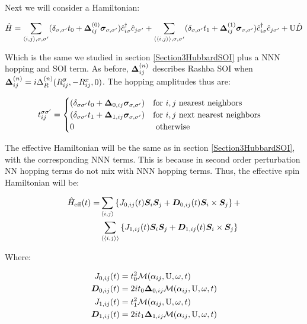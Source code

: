 Next we will consider a Hamiltonian:

\begin{equation}
\hat{H} = \sum_{\langle i,j \rangle, \sigma, \sigma'}(\delta_{\sigma, \sigma'} t_0 + \boldsymbol{\Delta}_{ij}^{(0)} \boldsymbol{\sigma}_{\sigma, \sigma'})\hat{c}_{i \sigma}^\dagger \hat{c}_{j \sigma'} + 
	\sum_{\langle \langle i,j \rangle \rangle, \sigma, \sigma'}(\delta_{\sigma, \sigma'} t_1 + \boldsymbol{\Delta}_{ij}^{(1)} \boldsymbol{\sigma}_{\sigma, \sigma'})\hat{c}_{i \sigma}^\dagger \hat{c}_{j \sigma'} + 
	\text{U}\hat{D}
\end{equation}

Which is the same we studied in section \ref{Section3HubbardSOI} plus a NNN hopping and SOI term. As before, $\boldsymbol{\Delta}_{ij}^{(n)}$ describes Rashba SOI when $\boldsymbol{\Delta}_{ij}^{(n)} = i\Delta_R^{(n)}(R_{ij}^y, -R_{ij}^x, 0)$.
The hopping amplitudes thus are:

\begin{equation}
\label{HoppHubbSOI}
t_{ij}^{\sigma \sigma'} = \begin{cases}
	(\delta_{\sigma \sigma'}t_0+\boldsymbol{\Delta}_{0,ij} \boldsymbol{\sigma}_{\sigma, \sigma'}) & \text{for } i, j \text{ nearest neighbors} \\
	(\delta_{\sigma \sigma'}t_1+\boldsymbol{\Delta}_{1,ij} \boldsymbol{\sigma}_{\sigma, \sigma'}) & \text{for } i, j \text{ next nearest neighbors} \\
	0 & \text{ otherwise}
\end{cases} \quad
\end{equation}

The effective Hamiltonian will be the same as in section \ref{Section3HubbardSOI}, with the corresponding NNN terms. This is because in second order perturbation NN hopping terms do not mix with NNN hopping terms. Thus, the effective spin Hamiltonian will be:

\begin{align}
\hat{H}_{\text{eff}}(t) = &\sum_{\langle i,j \rangle} \left\{ J_{0,ij}(t)\boldsymbol{S}_i\boldsymbol{S}_j + \boldsymbol{D}_{0,ij}(t) \boldsymbol{S}_i \times \boldsymbol{S}_j \right\} + \nonumber \\
&\sum_{\langle \langle i,j \rangle \rangle} \left\{ J_{1,ij}(t)\boldsymbol{S}_i\boldsymbol{S}_j + \boldsymbol{D}_{1,ij}(t) \boldsymbol{S}_i \times \boldsymbol{S}_j \right\}
\end{align}

Where:

\begin{align*}
J_{0,ij}(t) &= t_0^2\mathcal{M}(\alpha_{ij}, \text{U}, \omega, t) \\
\boldsymbol{D}_{0,ij}(t) &= 2it_0 \boldsymbol{\Delta}_{0,ij}\mathcal{M}(\alpha_{ij}, \text{U}, \omega, t) \\
J_{1,ij}(t) &= t_1^2\mathcal{M}(\alpha_{ij}, \text{U}, \omega, t) \\
\boldsymbol{D}_{1,ij}(t) &= 2it_1 \boldsymbol{\Delta}_{1,ij}\mathcal{M}(\alpha_{ij}, \text{U}, \omega, t)
\end{align*}